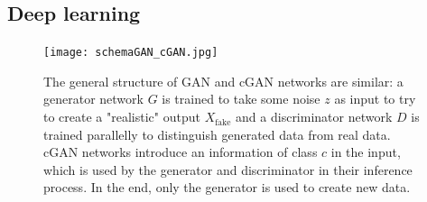 






\subsection{Deep learning}
\label{sec:coral-island_sota-deep-learning}
\begin{figure}[H]
	\centering
	\texttt{[image: schemaGAN\_cGAN.jpg]}
    \caption{The general structure of GAN and cGAN networks are similar: a generator network $G$ is trained to take some noise $z$ as input to try to create a "realistic" output $X_{\text{fake}}$ and a discriminator network $D$ is trained parallelly to distinguish generated data from real data. cGAN networks introduce an information of class $c$ in the input, which is used by the generator and discriminator in their inference process. In the end, only the generator is used to create new data. }
    \label{fig:coral-island_GAN-scheme}
\end{figure}

